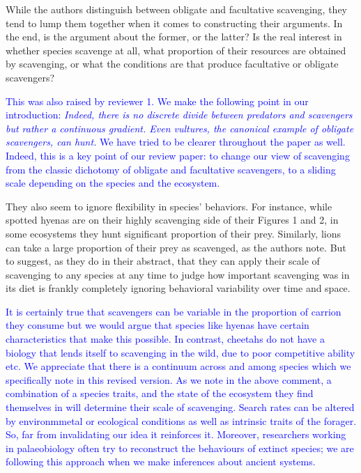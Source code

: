 \documentclass[12pt,letterpaper]{article}
\begin{document}

\smallskip

While the authors distinguish between obligate and facultative scavenging, they tend to lump them together when it comes to constructing their arguments.
In the end, is the argument about the former, or the latter? Is the real interest in whether species scavenge at all, what proportion of their resources are obtained by scavenging, or what the conditions are that produce facultative or obligate scavengers? 

\textcolor{blue} {This was also raised by reviewer 1.
We make the following point in our introduction: \textit{Indeed, there is no discrete divide between predators and scavengers but rather a continuous gradient. Even vultures, the canonical example of obligate scavengers, can hunt.} We have tried to be clearer throughout the paper as well. Indeed, this is a key point of our review paper: to change our view of scavenging from the classic dichotomy of obligate and facultative scavengers, to a sliding scale depending on the species and the ecosystem. }

They also seem to ignore flexibility in species' behaviors.
For instance, while spotted hyenas are on their highly scavenging side of their Figures 1 and 2, in some ecosystems they hunt significant proportion of their prey.
Similarly, lions can take a large proportion of their prey as scavenged, as the authors note.
But to suggest, as they do in their abstract, that they can apply their scale of scavenging to any species at any time to judge how important scavenging was in its diet is frankly completely ignoring behavioral variability over time and space. 
\smallskip

\textcolor{blue}{It is certainly true that scavengers can be variable in the proportion of carrion they consume but we would argue that species like hyenas have certain characteristics that make this possible.
In contrast, cheetahs do not have a biology that lends itself to scavenging in the wild, due to poor competitive ability etc.
We appreciate that there is a continuum across and among species which we specifically note in this revised version. 
As we note in the above comment, a combination of a species traits, and the state of the ecosystem they find themselves in will determine their scale of scavenging. 
Search rates can be altered by environmmetal or ecological conditions as well as intrinsic traits of the forager. 
So, far from invalidating our idea it reinforces it.
Moreover, researchers working in palaeobiology often try to reconstruct the behaviours of extinct species; we are following this approach when we make inferences about ancient systems.}
\smallskip
\end{document}
